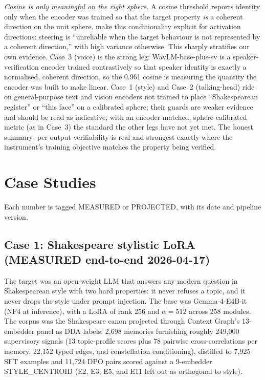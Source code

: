 \documentclass[10pt,twocolumn]{article}
\begin{document}
\emph{Cosine is only meaningful on the right sphere.} A cosine threshold reports
identity only when the encoder was trained so that the target property
\emph{is} a coherent direction on the unit sphere. \citet{braun2025steering}
make this conditionality explicit for activation directions: steering is
``unreliable when the target behaviour is not represented by a coherent
direction,'' with high variance otherwise. This sharply stratifies our own
evidence. Case~3 (voice) is the strong leg: WavLM-base-plus-sv is a
speaker-verification encoder trained contrastively so that speaker identity is
exactly a normalised, coherent direction, so the 0.961 cosine is measuring the
quantity the encoder was built to make linear. Case~1 (style) and Case~2
(talking-head) ride on general-purpose text and vision encoders not trained to
place ``Shakespearean register'' or ``this face'' on a calibrated sphere; their
guards are weaker evidence and should be read as indicative, with an
encoder-matched, sphere-calibrated metric (as in Case~3) the standard the other
legs have not yet met. The honest summary: per-output verifiability is real and
strongest exactly where the instrument's training objective matches the property
being verified.

\section{Case Studies}
\label{sec:cases}
Each number is tagged MEASURED or PROJECTED, with its date and pipeline version.

\subsection{Case 1: Shakespeare stylistic LoRA (MEASURED end-to-end 2026-04-17)}
The target was an open-weight LLM that answers any modern question in Shakespearean
style with two hard properties: it never refuses a topic, and it never drops the
style under prompt injection. The base was Gemma-4-E4B-it (NF4 at inference), with
a LoRA of rank 256 and $\alpha=512$ across 258 modules. The corpus was the
Shakespeare canon projected through Context Graph's 13-embedder panel as DDA
labels: 2{,}698 memories furnishing roughly 249{,}000 supervisory signals (13
topic-profile scores plus 78 pairwise cross-correlations per memory, 22{,}152 typed
edges, and constellation conditioning), distilled to 7{,}925 SFT examples and
11{,}724 DPO pairs scored against a 9-embedder STYLE\_CENTROID (E2, E3, E5, and E11
left out as orthogonal to style).
\end{document}
